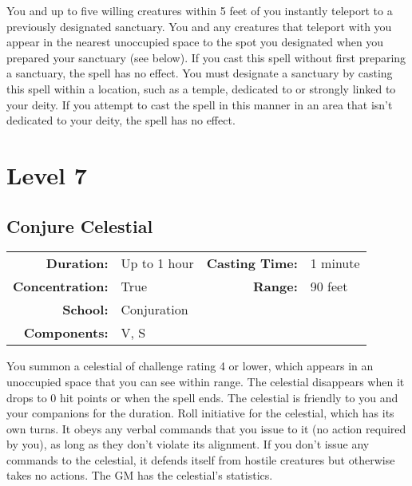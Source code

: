 \documentclass[a5paper, 12pt]{memoir}
\begin{document}
\vspace{1\baselineskip}\noindent You and up to five willing creatures within 5 feet of you instantly teleport to a previously designated sanctuary. You and any creatures that teleport with you appear in the nearest unoccupied space to the spot you designated when you prepared your sanctuary (see below). If you cast this spell without first preparing a sanctuary, the spell has no effect. You must designate a sanctuary by casting this spell within a location, such as a temple, dedicated to or strongly linked to your deity. If you attempt to cast the spell in this manner in an area that isn't dedicated to your deity, the spell has no effect.

\newpage
\chapter*{Level 7} 
\section*{Conjure Celestial}

{
\small\centering\vspace{-6pt}
\begin{tabular}{rlrl}
\toprule

\textbf{Duration:} & Up to 1 hour &
\textbf{Casting Time:} & 1 minute \\
\textbf{Concentration:} & True &
\textbf{Range:} & 90 feet \\
\textbf{School:} & Conjuration \\
\textbf{Components:} & \multicolumn{3}{p{0.7\textwidth}}{V, S}\\

\bottomrule
\end{tabular}
}

\vspace{1\baselineskip}\noindent You summon a celestial of challenge rating 4 or lower, which appears in an unoccupied space that you can see within range. The celestial disappears when it drops to 0 hit points or when the spell ends. The celestial is friendly to you and your companions for the duration. Roll initiative for the celestial, which has its own turns. It obeys any verbal commands that you issue to it (no action required by you), as long as they don't violate its alignment. If you don't issue any commands to the celestial, it defends itself from hostile creatures but otherwise takes no actions. The GM has the celestial's statistics.
\end{document}
